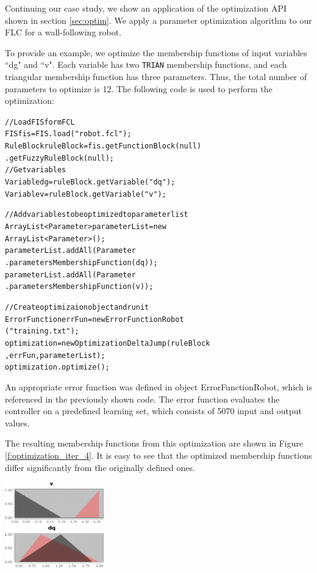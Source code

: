 \documentclass[11pt,twoside]{article}
\begin{document}
\begin{multicols}{2}
Continuing our case study, we show an application of the optimization API shown in section \ref{sec:optim}. We apply a parameter optimization algorithm to our FLC for a wall-following robot.

To provide an example, we optimize the membership functions of input variables ``dg" and ``v". Each variable has two \texttt{TRIAN} membership functions, and each triangular membership function has three parameters. Thus, the total number of parameters to optimize is 12. The following code is used to perform the optimization:
\vspace*{5pt}
\begin{scriptsize}
\begin{alltt}
// Load FIS form FCL
FIS fis = FIS.load("robot.fcl");
RuleBlock ruleBlock = fis.getFunctionBlock(null)
                            .getFuzzyRuleBlock(null);
// Get variables
Variable dg = ruleBlock.getVariable("dq");
Variable v = ruleBlock.getVariable("v");

// Add variables to be optimized to parameter list
ArrayList<Parameter> parameterList = new 
                              ArrayList<Parameter>();
parameterList.addAll(Parameter
                  .parametersMembershipFunction(dq));
parameterList.addAll(Parameter
                  .parametersMembershipFunction(v));

// Create optimizaion object and run it
ErrorFunction errFun = new ErrorFunctionRobot
                                    ("training.txt");
optimization = new OptimizationDeltaJump(ruleBlock
                            , errFun, parameterList);
optimization.optimize();
\end{alltt}
\end{scriptsize}
\vspace*{5pt}

An appropriate error function was defined in object ErrorFunctionRobot, which is referenced in the previously shown code. The error function evaluates the controller on a predefined learning set, which consists of 5070 input and output values.

The resulting membership functions from this optimization are shown in Figure \ref{f:optimization_iter_4}. It is easy to see that the optimized membership functions differ significantly from the originally defined ones.

\vspace*{5pt}
\centerline{\includegraphics[width=1.7in]{./figs/optimization_iter_4.png}}
\vspace*{5pt}
\label{f:optimization_iter_4}
\vspace*{5pt}


\end{multicols}
\end{document}
